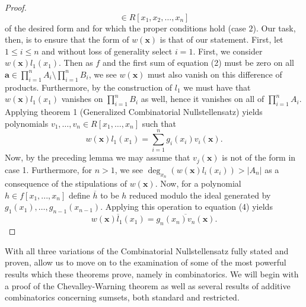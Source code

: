 \begin{proof}[Proof]
\[\in R[x_1, x_2, \ldots, x_{n}]\] of the desired form and for which the
	proper conditions hold (case $2$). Our task, then, is to ensure that
	the form of $w\left( \textbf{x} \right)$ is that of our statement.
	First, let $1 \le i \le n$ and without loss of generality select $i
	=1$. First, we consider $w\left( \textbf{x} \right) l_1\left( x_1
	\right) $. Then as $f$ and the first sum of equation (2) must be zero
	on all $\textbf{a}\in \prod_{i= 1}^{n} A_{i} \setminus \prod_{i= 1}^{n}
	B_{i}$, we see $w\left( \textbf{x} \right) $ must also vanish on this
	difference of products. Furthermore, by the construction of $l_1$ we
	must have that $w\left( \textbf{x} \right) l_1 \left( x_1 \right) $
	vanishes on $\prod_{i= 1}^{n} B_{i}$ as well, hence it vanishes on all
	of $\prod_{i= 1}^{n} A_{i}$. Applying theorem 1 (Generalized
	Combinatorial Nullstellensatz) yields polynomials $v_1, \ldots, v_{n}
	\in R[x_1, \ldots, x_{n}]$ such that \begin{equation} w\left(
		\textbf{x} \right) l_1 \left( x_1 \right) = \sum_{i= 1}^{n}
		g_{i} \left( x_{i} \right) v_{i} \left( \textbf{x} \right)
		.\end{equation} Now, by the preceding lemma we may assume that
		$v_{j} \left( \textbf{x} \right) $ is not of the form in case
		1. Furthermore, for $n>1$, we see $\deg _{x_{n}} \left( w
		\left( \textbf{x} \right) l_{i} \left( x_{i} \right)  \right) >
		\left| A_{n} \right| $ as a consequence of the stipulations of
		$w\left( \textbf{x} \right) $. Now, for a polynomial $h \in
		f[x_1, ..., x_{n}]$ define $\overline{h}$ to be $h$ reduced
		modulo the ideal generated by $g_1 \left( x_1 \right) , \ldots,
		g_{n-1}\left( x_{n-1} \right) $. Applying this operation to
		equation (4) yields  \[ \overline{w\left( \textbf{x} \right)
		l_{1} \left( x_1 \right) } = \overline{g_{n}\left( x_{n}
\right) v_{n} \left( \textbf{x} \right) } .\]
\end{proof} With all three variations of the Combinatorial
Nullstellensatz fully stated and proven, allow us to move on to the examination
of some of the most powerful results which these theorems prove, namely in
combinatorics. We will begin with a proof of the Chevalley-Warning theorem as
well as several results of additive combinatorics concerning sumsets, both
standard and restricted.
